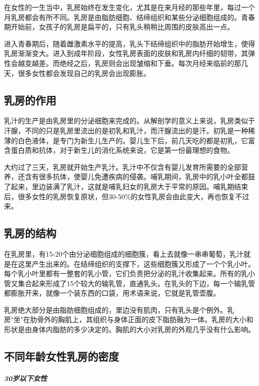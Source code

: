 \begin{enumerate}
在女性的一生当中，乳房始终在发生变化，尤其是在来月经的那些年里，每过一个月乳房都会有所不同。乳房是由脂肪细胞、结缔组织和某些分泌细胞组成的。青春期开始前，女孩子的乳房是扁平的，只有乳头稍稍比周围的皮肤高出一点。

进入青春期后，随着雌激素水平的提高，乳头下结缔组织中的脂肪开始增生，使得乳房渐渐变大。进入到成年阶段，女性乳房表面的皮肤和乳房内纤细的韧带，其弹性会越变越差。而绝经之后，乳房则会出现皱缩和下垂。每次月经来临前的那几天，很多女性都会发现自己的乳房会出现膨胀。

\subsection{乳房的作用}

乳汁的生产是由乳房里的分泌细胞来完成的。从解剖学的意义上来说，乳房类似于汗腺，不同的只是乳房里流出的是初乳和乳汁，而汗腺流出的是汗。初乳是一种稀薄的白色液体，是专门为新生儿生产的。婴儿生下后，前几天吃的都是初乳，它富含蛋白质和抗体，对于新生儿的消化系统来说，它是第一份最理想的食物。

大约过了三天，乳房就开始生产乳汁。乳汁中不仅含有婴儿发育所需要的全部营养，还含有很多抗体，使婴儿免遭疾病的侵袭。哺乳期间，乳房中的乳小叶全都鼓了起来，里边装满了乳汁，这就是哺乳妇女的乳房大于平常的原因。哺乳期结束后，很多女性的乳房恢复原状，但30-50\%的女性乳房会由此变大，再也恢复不过来。

\subsection{乳房的结构}

在乳房里，有15-20个由分泌细胞组成的细胞簇，看上去就像一串串葡萄，乳汁就是在这里产生出来的。在结缔组织的支撑下，这些细胞簇又形成了一个个乳小叶。每个乳小叶里都有一整套的乳小管，它们负责把分泌的乳汁收集起来。所有的乳小管又集合起来形成了15个较大的输乳管，直通乳头。在乳头的下边，每一个输乳管都膨胀开来，就像一个装东西的口袋，用术语来说，它就是乳管壶腹。

乳房绝大部分是由脂肪细胞组成的，里边没有肌肉，只有乳头是个例外。乳房"坐"在肋骨外的胸肌上，其组织与身体正面的皮下脂肪融为一体。乳房的大小和形状是由身体内脂肪的多少决定的。胸肌的大小对乳房的外观几乎没有什么影响。

\subsection{不同年龄女性乳房的密度}

\subparagraph{30岁以下女性}


\end{enumerate}
